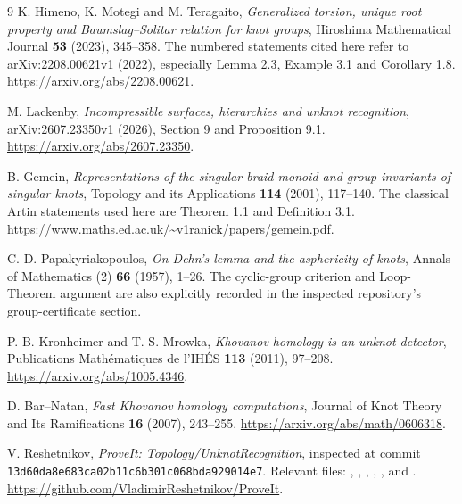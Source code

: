 \documentclass[11pt]{article}
\theoremstyle{definition}\newtheorem{definition}[theorem]{Definition}
\theoremstyle{remark}\newtheorem{remark}[theorem]{Remark}
\begin{document}
\begin{thebibliography}{9}
K. Himeno, K. Motegi and M. Teragaito,
\emph{Generalized torsion, unique root property and Baumslag--Solitar
relation for knot groups}, Hiroshima Mathematical Journal \textbf{53}
(2023), 345--358. The numbered statements cited here refer to
arXiv:2208.00621v1 (2022), especially Lemma 2.3, Example 3.1 and
Corollary 1.8. \url{https://arxiv.org/abs/2208.00621}.

M. Lackenby, \emph{Incompressible surfaces, hierarchies and unknot
recognition}, arXiv:2607.23350v1 (2026), Section 9 and Proposition 9.1.
\url{https://arxiv.org/abs/2607.23350}.

B. Gemein, \emph{Representations of the singular braid monoid and group
invariants of singular knots}, Topology and its Applications \textbf{114}
(2001), 117--140. The classical Artin statements used here are Theorem 1.1
and Definition 3.1.
\url{https://www.maths.ed.ac.uk/~v1ranick/papers/gemein.pdf}.

C. D. Papakyriakopoulos, \emph{On Dehn's lemma and the asphericity of
knots}, Annals of Mathematics (2) \textbf{66} (1957), 1--26.
The cyclic-group criterion and Loop-Theorem argument are also explicitly
recorded in the inspected repository's group-certificate section.

P. B. Kronheimer and T. S. Mrowka,
\emph{Khovanov homology is an unknot-detector}, Publications
Math\'ematiques de l'IH\'ES \textbf{113} (2011), 97--208.
\url{https://arxiv.org/abs/1005.4346}.

D. Bar--Natan, \emph{Fast Khovanov homology computations},
Journal of Knot Theory and Its Ramifications \textbf{16} (2007), 243--255.
\url{https://arxiv.org/abs/math/0606318}.

V. Reshetnikov, \emph{ProveIt: Topology/UnknotRecognition}, inspected at
commit \texttt{13d60da8e683ca02b11c6b301c068bda929014e7}.
Relevant files: ,
, ,
, , and
.
\url{https://github.com/VladimirReshetnikov/ProveIt}.
\end{thebibliography}
\end{document}

